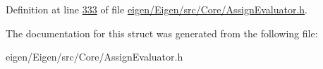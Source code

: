 Definition at line \hyperlink{eigen_2_eigen_2src_2_core_2_assign_evaluator_8h_source_l00333}{333} of file \hyperlink{eigen_2_eigen_2src_2_core_2_assign_evaluator_8h_source}{eigen/\+Eigen/src/\+Core/\+Assign\+Evaluator.\+h}.



The documentation for this struct was generated from the following file\+:\begin{DoxyCompactItemize}
\item 
eigen/\+Eigen/src/\+Core/\+Assign\+Evaluator.\+h\end{DoxyCompactItemize}
